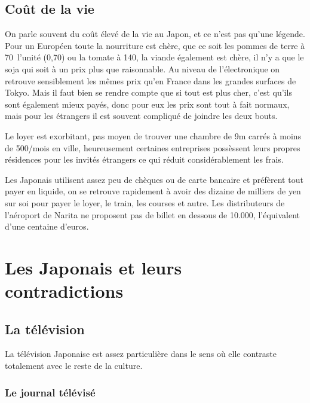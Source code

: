 \documentclass[11pt,journal]{RapportFR}
\begin{document}
\begin{CJK*}{UTF8}{min}
\subsection{Co\^ut de la vie}

On parle souvent du co\^ut \'elev\'e de la vie au Japon, et ce n'est pas qu'une l\'egende. Pour un Europ\'een toute la nourriture est ch\`ere, que ce soit les pommes de terre \`a 70\textyen~l'unit\'e (0,70\texteuro) ou la tomate \`a 140\textyen, la viande \'egalement est ch\`ere, il n'y a que le soja qui soit \`a un prix plus que raisonnable. Au niveau de l'\'electronique on retrouve sensiblement les m\^emes prix qu'en France dans les grandes surfaces de Tokyo. Mais il faut bien se rendre compte que si tout est plus cher, c'est qu'ils sont \'egalement mieux pay\'es, donc pour eux les prix sont tout \`a fait normaux, mais pour les \'etrangers il est souvent compliqu\'e de joindre les deux bouts.

Le loyer est exorbitant, pas moyen de trouver une chambre de 9m carr\'es \`a moins de 500\texteuro/mois en ville, heureusement certaines entreprises poss\`essent leurs propres r\'esidences pour les invit\'es \'etrangers ce qui r\'eduit consid\'erablement les frais.

Les Japonais utilisent assez peu de ch\`eques ou de carte bancaire et pr\'ef\`erent tout payer en liquide, on se retrouve rapidement \`a avoir des dizaine de milliers de yen sur soi pour payer le loyer, le train, les courses et autre. Les distributeurs de l'a\'eroport de Narita ne proposent pas de billet en dessous de 10.000\textyen, l'\'equivalent d'une centaine d'euros.


\section{Les Japonais et leurs contradictions}
\label{sec_contradictions}

\subsection{La t\'el\'evision}

La t\'el\'evision Japonaise est assez particuli\`ere dans le sens o\`u elle contraste totalement avec le reste de la culture.

\subsubsection{Le journal t\'el\'evis\'e}


\end{CJK*}
\end{document}
